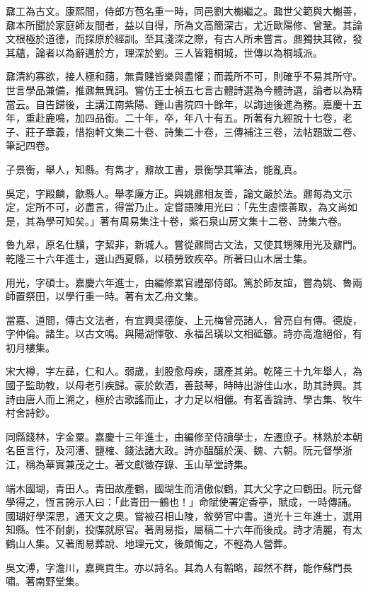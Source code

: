 \begin{pinyinscope}
鼐工為古文。康熙間，侍郎方苞名重一時，同邑劉大櫆繼之。鼐世父範與大櫆善，鼐本所聞於家庭師友間者，益以自得，所為文高簡深古，尤近歐陽修、曾鞏。其論文根極於道德，而探原於經訓。至其淺深之際，有古人所未嘗言。鼐獨抉其微，發其蘊，論者以為辭邁於方，理深於劉。三人皆籍桐城，世傳以為桐城派。

鼐清約寡欲，接人極和藹，無貴賤皆樂與盡懽；而義所不可，則確乎不易其所守。世言學品兼備，推鼐無異詞。嘗仿王士禎五七言古體詩選為今體詩選，論者以為精當云。自告歸後，主講江南紫陽、鍾山書院四十餘年，以誨迪後進為務。嘉慶十五年，重赴鹿鳴，加四品銜。二十年，卒，年八十有五。所著有九經說十七卷，老子、莊子章義，惜抱軒文集二十卷、詩集二十卷，三傳補注三卷，法帖題跋二卷、筆記四卷。

子景衡，舉人，知縣。有雋才，鼐故工書，景衡學其筆法，能亂真。

吳定，字殿麟，歙縣人。舉孝廉方正。與姚鼐相友善，論文嚴於法。鼐每為文示定，定所不可，必盡言，得當乃止。定嘗語陳用光曰：「先生虛懷善取，為文尚如是，其為學可知矣。」著有周易集注十卷，紫石泉山房文集十二卷、詩集六卷。

魯九皋，原名仕驥，字絜非，新城人。嘗從鼐問古文法，又使其甥陳用光及鼐門。乾隆三十六年進士，選山西夏縣，以積勞致疾卒。所著曰山木居士集。

用光，字碩士。嘉慶六年進士，由編修累官禮部侍郎。篤於師友誼，嘗為姚、魯兩師置祭田，以學行重一時。著有太乙舟文集。

當嘉、道間，傳古文法者，有宜興吳德旋、上元梅曾亮諸人，曾亮自有傳。德旋，字仲倫。諸生。以古文鳴。與陽湖惲敬、永福呂璜以文相砥鏃。詩亦高澹絕俗，有初月樓集。

宋大樽，字左彞，仁和人。弱歲，刲股愈母疾，讓產其弟。乾隆三十九年舉人，為國子監助教，以母老引疾歸。豪於飲酒，善鼓琴，時時出游佳山水，助其詩興。其詩由唐人而上溯之，極於古歌謠而止，才力足以相儷。有茗香論詩、學古集、牧牛村舍詩鈔。

同縣錢林，字金粟。嘉慶十三年進士，由編修至侍讀學士，左遷庶子。林熟於本朝名臣言行，及河漕、鹽榷、錢法諸大政。詩亦醖釀於漢、魏、六朝。阮元督學浙江，稱為華實兼茂之士。著文獻徵存錄、玉山草堂詩集。

端木國瑚，青田人。青田故產鶴，國瑚生而清傲似鶴，其大父字之曰鶴田。阮元督學得之，恆言誇示人曰：「此青田一鶴也！」命賦使署定香亭，賦成，一時傳誦。國瑚好學深思，通天文之奧。嘗被召相山陵，敘勞官中書。道光十三年進士，選用知縣。性不耐劇，投牒就原官。著周易指，屬稿二十六年而後成。詩才清麗，有太鶴山人集。又著周易葬說、地理元文，後頗悔之，不輕為人營葬。

吳文溥，字澹川，嘉興貢生。亦以詩名。其為人有韜略，超然不群，能作蘇門長嘯。著南野堂集。


\end{pinyinscope}
